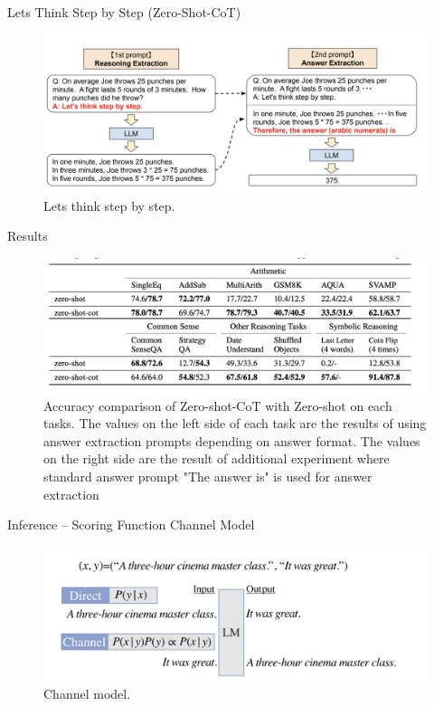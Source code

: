 \documentclass[aspectratio=1610,xcolor={dvipsnames},hyperref={colorlinks,unicode,linkcolor=violet,anchorcolor=BlueViolet,citecolor=YellowOrange,filecolor=black,urlcolor=Aquamarine}]{beamer}
\begin{document}
\begin{frame}[label={sec:orgced2402}]{Lets Think Step by Step (Zero-Shot-CoT) }
\begin{figure}[htbp]
\centering
\includegraphics[width=.9\linewidth]{./p4.png}
\caption{\label{fig:org12ffdb9}Lets think step by step.}
\end{figure}
\end{frame}

\begin{frame}[label={sec:orgd94c884}]{Results}
\begin{figure}[htbp]
\centering
\includegraphics[width=.9\linewidth]{./p10.png}
\caption{\label{fig:org4ff6b03}Accuracy comparison of Zero-shot-CoT with Zero-shot on each tasks. The values on the left side of each task are the results of using answer extraction prompts depending on answer format.  The values on the right side are the result of additional experiment where standard answer prompt "The answer is" is used for answer extraction}
\end{figure}
\end{frame}

\begin{frame}[label={sec:org61651aa}]{Inference -- Scoring Function}
Channel Model 

\begin{figure}[htbp]
\centering
\includegraphics[width=.9\linewidth]{./p5.png}
\caption{\label{fig:org12bb484}Channel model.}
\end{figure}
\end{frame}
\end{document}
